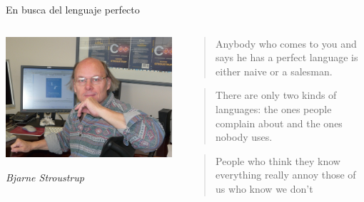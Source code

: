 \begin{frame}[t]{En busca del lenguaje perfecto}
  \begin{columns}
    \begin{column}{0.3\textwidth}
      \includegraphics[width=\textwidth]{images/stroustrup.jpg}

      \emph{Bjarne Stroustrup}
    \end{column}
    \begin{column}{0.7\textwidth}
      \begin{quote}
        Anybody who comes to you and says he has a perfect language is either naive or a salesman.
      \end{quote}
      \begin{quote}
        There are only two kinds of languages: the ones people complain about and the ones nobody uses.
      \end{quote}
      \begin{quote}
        People who think they know everything really annoy those of us who know we don't
      \end{quote}
    \end{column}
  \end{columns}
\end{frame}

